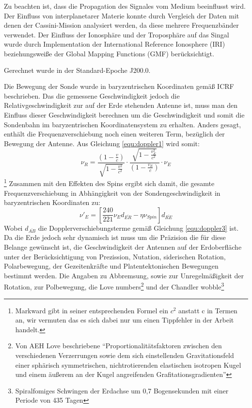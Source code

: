 Zu beachten ist, dass die Propagation des Signales vom Medium beeinflusst wird. Der Einfluss von interplanetarer Materie konnte durch Vergleich
der Daten mit denen der Cassini-Mission analysiert werden, da diese mehrere Frequenzbänder verwendet.\cite{Dittus2006} %
Der Einfluss der Ionosphäre und der Troposphäre auf das Singal wurde durch Implementation der International Reference Ionosphere (IRI)
beziehungsweiße der Global Mapping Functions (GMF) berücksichtigt.\cite{Levy2008} %

Gerechnet wurde in der Standard-Epoche J200.0. %

Die Bewegung der Sonde wurde in baryzentrischen Koordinaten gemäß ICRF beschrieben. %
Das die gemessene Geschwindigkeit jedoch die Relativgeschwindigkeit zur auf der Erde stehenden Antenne ist,
muss man den Einfluss dieser Geschwindigkeit berechnen um die Geschwindigkeit und somit die Sondenbahn im baryzentrischen Koordinatensystem zu erhalten.
Anders gesagt, enthält die Frequenzverschiebung noch einen weiteren Term, bezüglich der Bewegung der Antenne. Aus Gleichung \ref{equ:doppler1} wird somit:
\begin{equation}
\label{equ:doppler3}
 \nu_R = \frac{(1-\frac{v}{c})}{\sqrt{1-\frac{v^2}{c^2}}} \cdot \frac{\sqrt{1-\frac{v_E^2}{c^2}}}{(1-\frac{v_E}{c})} \cdot \nu_E
\end{equation}\footnote{Markward gibt in seiner entsprechenden Formel ein $c^2$ anstatt c in Termen an, wir vermuten das es sich dabei nur um einen Tippfehler in der Arbeit handelt.}
Zusammen mit den Effekten des Spins ergibt sich damit, die gesamte Frequenzverschiebung in Abhängigkeit von der Sondengeschwindigkeit in baryzentrischen Koordinaten zu:
\begin{equation}
 \nu'_E = \left[ \frac{240}{221} \nu_E d_{\bar{ER}} - \eta \nu_{Spin} \right]  d_{\bar{RE}}
\end{equation}
Wobei $d_{\bar{AB}}$ die Dopplerverschiebungsterme gemäß Gleichung \ref{equ:doppler3} ist.
Da die Erde jedoch sehr dynamisch ist muss um die Präzision die für diese Belange gewünscht ist, die Geschwindigkeit der Antennen auf der Erdoberfläche unter der Berücksichtigung von Prezission, Nutation,
siderischen Rotation, Polarbewegung, der Gezeitenkräfte und Platentektonischen Bewegungen bestimmt werden.
Die Angaben zu Abbremsung, sowie zur Unregelmäßigkeit der Rotation, zur Polbewegung, die Love numbers\footnote{Von AEH Love beschriebene ``Proportionalitätsfaktoren zwischen den verschiedenen Verzerrungen sowie dem sich einstellenden Gravitationsfeld einer sphärisch symmetrischen, nichtrotierenden elastischen isotropen Kugel und einem äußerem an der Kugel angreifenden Grafitationsgradienten''\cite{Dittus2006}} und der Chandler wobble\footnote{Spiralfomiges Schwingen
der Erdachse um 0,7 Bogensekunden mit einer Periode von 435 Tagen} %

